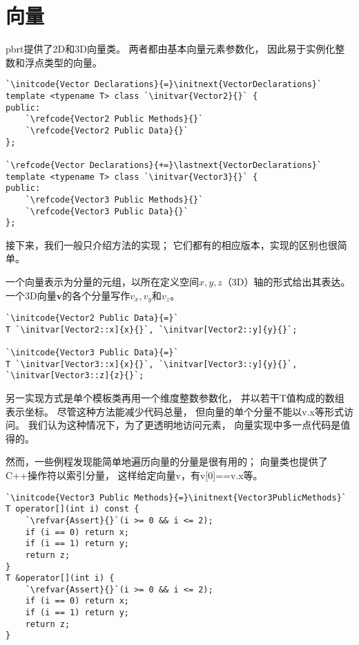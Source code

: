 \section{向量}\label{sec:向量}

pbrt提供了2D和3D向量类。
两者都由基本向量元素参数化，
因此易于实例化整数和浮点类型的向量。

\begin{lstlisting}
`\initcode{Vector Declarations}{=}\initnext{VectorDeclarations}`
template <typename T> class `\initvar{Vector2}{}` {
public:
    `\refcode{Vector2 Public Methods}{}`
    `\refcode{Vector2 Public Data}{}`
};

`\refcode{Vector Declarations}{+=}\lastnext{VectorDeclarations}`
template <typename T> class `\initvar{Vector3}{}` {
public:
    `\refcode{Vector3 Public Methods}{}`
    `\refcode{Vector3 Public Data}{}`
};
\end{lstlisting}

接下来，我们一般只介绍方法的实现；
它们都有的相应版本，实现的区别也很简单。

一个向量表示为分量的元组，以所在定义空间$x,y,z$（3D）轴的形式给出其表达。
一个3D向量$\bm v$的各个分量写作$v_x,v_y$和$v_z$。

\begin{lstlisting}
`\initcode{Vector2 Public Data}{=}`
T `\initvar[Vector2::x]{x}{}`, `\initvar[Vector2::y]{y}{}`;

`\initcode{Vector3 Public Data}{=}`
T `\initvar[Vector3::x]{x}{}`, `\initvar[Vector3::y]{y}{}`, `\initvar[Vector3::z]{z}{}`;
\end{lstlisting}

另一实现方式是单个模板类再用一个维度整数参数化，
并以若干{\ttfamily T}值构成的数组表示坐标。
尽管这种方法能减少代码总量，
但向量的单个分量不能以{\ttfamily v.x}等形式访问。
我们认为这种情况下，为了更透明地访问元素，
向量实现中多一点代码是值得的。

然而，一些例程发现能简单地遍历向量的分量是很有用的；
向量类也提供了C++操作符以索引分量，
这样给定向量{\ttfamily v}，有{\ttfamily v[0]==v.x}等。
\begin{lstlisting}
`\initcode{Vector3 Public Methods}{=}\initnext{Vector3PublicMethods}`
T operator[](int i) const { 
    `\refvar{Assert}{}`(i >= 0 && i <= 2);
    if (i == 0) return x;
    if (i == 1) return y;
    return z;
}
T &operator[](int i) { 
    `\refvar{Assert}{}`(i >= 0 && i <= 2);
    if (i == 0) return x;
    if (i == 1) return y;
    return z;
}
\end{lstlisting}

